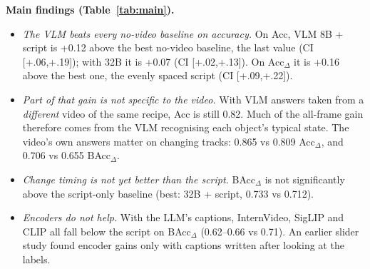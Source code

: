 \documentclass[10pt]{article}
\begin{document}
\textbf{Main findings (Table~\ref{tab:main}).}
\begin{itemize}
\item \emph{The VLM beats every no-video baseline on accuracy.} On Acc, VLM 8B + script is +0.12 above the best no-video baseline, the last value (CI [+.06,+.19]); with 32B it is +0.07 (CI [+.02,+.13]). On Acc$_\Delta$ it is +0.16 above the best one, the evenly spaced script (CI [+.09,+.22]).
\item \emph{Part of that gain is not specific to the video.} With VLM answers taken from a \emph{different} video of the same recipe, Acc is still 0.82. Much of the all-frame gain therefore comes from the VLM recognising each object's typical state. The video's own answers matter on changing tracks: 0.865 vs 0.809 Acc$_\Delta$, and 0.706 vs 0.655 BAcc$_\Delta$.
\item \emph{Change timing is not yet better than the script.} BAcc$_\Delta$ is not significantly above the script-only baseline (best: 32B + script, 0.733 vs 0.712).
\item \emph{Encoders do not help.} With the LLM's captions, InternVideo, SigLIP and CLIP all fall below the script on BAcc$_\Delta$ (0.62--0.66 vs 0.71). An earlier slider study found encoder gains only with captions written after looking at the labels.
\end{itemize}

\begin{table}[t]\centering\small
{}
\caption{Robustness. Acc, Acc$_\Delta$ and BAcc$_\Delta$ cells are \emph{evenly spaced script / VLM + script}; the last row gives VLM + script at each keyframe spacing. ``Acc, last value'' is the strongest no-video baseline on Acc.}\label{tab:rob}
\end{table}
\end{document}
